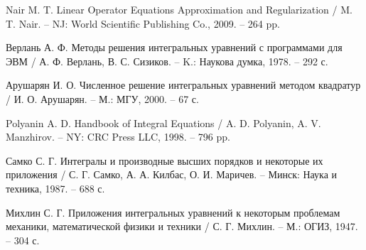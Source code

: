 \documentclass[14pt,twoside]{extreport}
\theoremstyle{mystyle}
\numberwithin{equation}{chapter}
\begin{document}
\begin{thebibliography}{20}
 Nair M. T. Linear Operator Equations Approximation and Regularization / M. T. Nair. -- NJ: World Scientific Publishing Co., 2009. -- 264 pp.

 Верлань А. Ф. Методы решения интегральных уравнений с программами для ЭВМ / А. Ф. Верлань, В. С. Сизиков. -- K.: Наукова думка, 1978. -- 292 с.

 Арушарян И. О. Численное решение интегральных уравнений методом квадратур / И. О. Арушарян. -- М.: МГУ, 2000. -- 67 с.


 Polyanin A. D. Handbook of Integral Equations / A. D. Polyanin, A. V. Manzhirov. -- NY: CRC Press LLC, 1998. -- 796 pp.

 Самко С. Г. Интегралы и производные высших порядков и некоторые их приложения / С. Г. Самко, А. А. Килбас, О. И. Маричев. -- Минск: Наука и техника, 1987. -- 688 с.

 Михлин С. Г. Приложения интегральных уравнений к некоторым проблемам механики, математической физики и техники / С. Г. Михлин. --  М.: ОГИЗ, 1947. -- 304 с.
\end{thebibliography}
\end{document}
